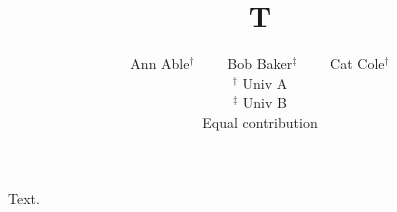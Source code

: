 \documentclass{article}
\title{T}
\author{Ann Able$^{\dagger}$ \ \ \ \ Bob Baker$^{\ddagger}$ \ \ \ \ Cat Cole$^{\dagger}$ \\ $^\dagger$ Univ A \\ $^\ddagger$ Univ B \\ Equal contribution}
\begin{document}
\maketitle
Text.
\end{document}
